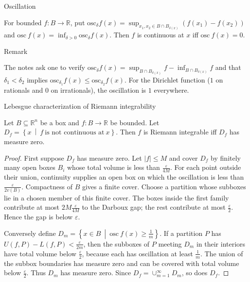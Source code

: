 \begin{definition}{Oscillation}

For bounded \(f:B\rightarrow\mathbb{R}\), put \(\text{osc}_{\delta}f(x) = \sup_{x_{1},x_{2} \in B \cap B_{\delta{(x)}}}\left( {f\left( x_{1} \right) - f\left( x_{2} \right)} \right)\) and \(\text{osc}\ f(x) = \inf_{\delta > 0}\text{osc}_{\delta}f(x)\). Then \(f\) is continuous at \(x\) iff \(\text{osc}\ f(x) = 0\).

\end{definition}

\begin{qlremark}{Remark}

The notes ask one to verify \(\text{osc}_{\delta}f(x) = \sup_{B \cap B_{\delta{(x)}}}f - \inf_{B \cap B_{\delta{(x)}}}f\) and that \(\delta_{1} < \delta_{2}\) implies \(\text{osc}_{\delta_{1}}f(x) \leq \text{osc}_{\delta_{2}}f(x)\). For the Dirichlet function (\(1\) on rationals and \(0\) on irrationals), the oscillation is \(1\) everywhere.

\end{qlremark}

\begin{theorem}{Lebesgue characterization of Riemann integrability}

Let \(B \subseteq \mathbb{R}^{n}\) be a box and \(f:B\rightarrow\mathbb{R}\) be bounded. Let \(D_{f} = \left\{ x\  \middle| \ f\ \text{is not continuous at}\ x \right\}\). Then \(f\) is Riemann integrable iff \(D_{f}\) has measure zero.

\end{theorem}

\begin{proof}

First suppose \(D_{f}\) has measure zero. Let \(|f| \leq M\) and cover \(D_{f}\) by finitely many open boxes \(B_{i}\) whose total volume is less than \(\frac{\varepsilon}{4M}\). For each point outside their union, continuity supplies an open box on which the oscillation is less than \(\frac{\varepsilon}{2v(B)}\). Compactness of \(B\) gives a finite cover. Choose a partition whose subboxes lie in a chosen member of this finite cover. The boxes inside the first family contribute at most \(2M\frac{\varepsilon}{4M}\) to the Darboux gap; the rest contribute at most \(\frac{\varepsilon}{2}\). Hence the gap is below \(\varepsilon\).

Conversely define \(D_{m} = \left\{ x \in B\  \middle| \ \text{osc}\ f(x) \geq \frac{1}{m} \right\}\). If a partition \(P\) has \(U\left( {f,P} \right) - L\left( {f,P} \right) < \frac{\varepsilon}{2m}\), then the subboxes of \(P\) meeting \(D_{m}\) in their interiors have total volume below \(\frac{\varepsilon}{2}\), because each has oscillation at least \(\frac{1}{m}\). The union of the subbox boundaries has measure zero and can be covered with total volume below \(\frac{\varepsilon}{2}\). Thus \(D_{m}\) has measure zero. Since \(D_{f} = \cup_{m = 1}^{\infty}D_{m}\), so does \(D_{f}\).

\end{proof}

